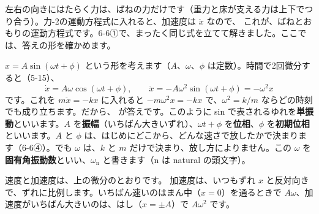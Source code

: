 \par\vspace{4pt}
左右の向きにはたらく力は、ばねの力だけです（重力と床が支える力は上下でつり合う）。力-2の運動方程式に入れると、加速度は $\ddot x$ なので、
これが、ばねとおもりの運動方程式です。6-6①で、まったく同じ式を立てて解きました。ここでは、答えの形を確かめます。

$x=A\sin(\omega t+\phi)$ という形を考えます（$A$、$\omega$、$\phi$ は定数）。時間で2回微分すると（5-15）、
\[\dot x=A\omega\cos(\omega t+\phi),\qquad \ddot x=-A\omega^2\sin(\omega t+\phi)=-\omega^2x\]
です。これを $m\ddot x=-kx$ に入れると $-m\omega^2x=-kx$ で、$\omega^2=k/m$ ならどの時刻でも成り立ちます。だから、
\label{ph:波-1:tanshindou}が答えです。このように sin で表されるゆれを\textbf{単振動}といいます。$A$ を\textbf{振幅}（いちばん大きいずれ）、$\omega t+\phi$ を\textbf{位相}、$\phi$ を\textbf{初期位相}といいます。$A$ と $\phi$ は、はじめにどこから、どんな速さで放したかで決まります（6-6④）。でも $\omega$ は、$k$ と $m$ だけで決まり、放し方によりません。この $\omega$ を\textbf{固有角振動数}といい、$\omega_{\mathrm n}$ と書きます（n は natural の頭文字）。

速度と加速度は、上の微分のとおりです。
加速度は、いつもずれ $x$ と反対向きで、ずれに比例します。いちばん速いのはまん中（$x=0$）を通るときで $A\omega$、加速度がいちばん大きいのは、はし（$x=\pm A$）で $A\omega^2$ です。

\begin{phflow}[ばねとおもり]
\end{phflow}

